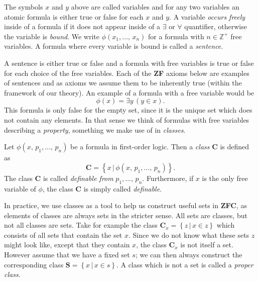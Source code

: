 \documentclass[../../main.tex]{subfiles}
\begin{document}
The symbols $x$ and $y$ above are called variables and for any two variables an atomic formula is either true or false for each $x$ and $y$.
A variable \textit{occurs freely} inside of a formula if it does not appear inside of a $\exists$ or $\forall$ quantifier, otherwise the variable is \textit{bound}.
We write $\phi\left(x_1,\ldots,\, x_n\right)$ for a formula with $n \in \mathbb{Z}^+$ free variables.
A formula where every variable is bound is called a \textit{sentence}. \cite[pp.10-11]{Mar02}

A sentence is either true or false and a formula with free variables is true or false for each choice of the free variables.
Each of the \textbf{ZF} axioms below are examples of sentences and as axioms we assume them to be inherently true (within the framework of our theory).
An example of a formula with a free variable would be $$\phi(x) = \exists y \, \left(y \in x\right).$$ 
This formula is only false for the empty set, since it is the unique set which does not contain any elements.
In that sense we think of formulas with free variables describing a \textit{property}, something we make use of in \textit{classes}.

\begin{definition}[Class]
    Let $\phi\left(x,\, p_1,\ldots,\, p_n\right)$ be a formula in first-order logic.
    Then a \textit{class} $\mathbf{C}$ is defined as
    $$\mathbf{C} = \left\{x \,\vert\, \phi\left(x,\, p_1,\ldots,\, p_n\right)\right\}.$$
    The class $\mathbf{C}$ is called \textit{definable from} $p_1,\ldots,\, p_n$.
    Furthermore, if $x$ is the only free variable of $\phi$, the class $\mathbf{C}$ is simply called \textit{definable}. \cite[p.3]{Jec78}
\end{definition}

In practice, we use classes as a tool to help us construct useful sets in \textbf{ZFC}, as elements of classes are always sets in the stricter sense.
All sets are classes, but not all classes are sets.
Take for example the class $\mathbf{C}_x = \left\{z \,\vert\, x \in z\right\}$ which consists of all sets that contain the set $x$.
Since we do not know what these sets $z$ might look like, except that they contain $x$, the class $\mathbf{C}_x$ is not itself a set.
However assume that we have a fixed set $s$; we can then always construct the corresponding class $\mathbf{S} = \left\{x \,\vert\, x \in s\right\}$.
A class which is not a set is called a \textit{proper class}.
\end{document}

